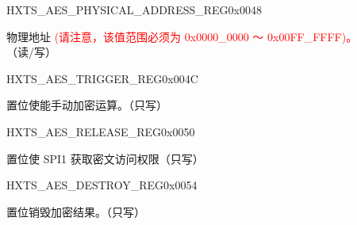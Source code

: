 \begin{register}{H}{XTS\_AES\_PHYSICAL\_ADDRESS\_REG}{0x0048}\label{regdesc:XTSAESPHYSICALADDRESSREG}
%
%
\regnewline%
\begin{regdesc}\begin{reglist}
\item [XTS\_AES\_PHYSICAL\_ADDRESS] 物理地址 \textcolor{red}{(请注意，该值范围必须为 0x0000\_0000 ～ 0x00FF\_FFFF)。} （读/写）
\end{reglist}\end{regdesc}
\end{register}

\begin{register}{H}{XTS\_AES\_TRIGGER\_REG}{0x004C}\label{regdesc:XTSAESTRIGGERREG}
%
%
\regnewline%
\begin{regdesc}\begin{reglist}
\item [XTS\_AES\_TRIGGER] 置位使能手动加密运算。（只写）
\end{reglist}\end{regdesc}
\end{register}

\begin{register}{H}{XTS\_AES\_RELEASE\_REG}{0x0050}\label{regdesc:XTSAESRELEASEREG}
%
%
\regnewline%
\begin{regdesc}\begin{reglist}
\item [XTS\_AES\_RELEASE] 置位使 SPI1 获取密文访问权限（只写）
\end{reglist}\end{regdesc}
\end{register}

\begin{register}{H}{XTS\_AES\_DESTROY\_REG}{0x0054}\label{regdesc:XTSAESDESTROYREG}
%
%
\regnewline%
\begin{regdesc}\begin{reglist}
\item [XTS\_AES\_DESTROY] 置位销毁加密结果。（只写）
\end{reglist}\end{regdesc}
\end{register}


